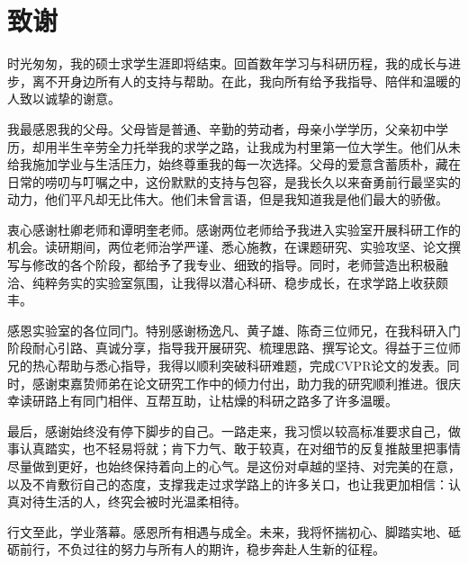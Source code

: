 \chapter{致谢}
时光匆匆，我的硕士求学生涯即将结束。回首数年学习与科研历程，我的成长与进步，离不开身边所有人的支持与帮助。在此，我向所有给予我指导、陪伴和温暖的人致以诚挚的谢意。

我最感恩我的父母。父母皆是普通、辛勤的劳动者，母亲小学学历，父亲初中学历，却用半生辛劳全力托举我的求学之路，让我成为村里第一位大学生。他们从未给我施加学业与生活压力，始终尊重我的每一次选择。父母的爱意含蓄质朴，藏在日常的唠叨与叮嘱之中，这份默默的支持与包容，是我长久以来奋勇前行最坚实的动力，他们平凡却无比伟大。他们未曾言语，但是我知道我是他们最大的骄傲。

衷心感谢杜卿老师和谭明奎老师。感谢两位老师给予我进入实验室开展科研工作的机会。读研期间，两位老师治学严谨、悉心施教，在课题研究、实验攻坚、论文撰写与修改的各个阶段，都给予了我专业、细致的指导。同时，老师营造出积极融洽、纯粹务实的实验室氛围，让我得以潜心科研、稳步成长，在求学路上收获颇丰。

感恩实验室的各位同门。特别感谢杨逸凡、黄子雄、陈奇三位师兄，在我科研入门阶段耐心引路、真诚分享，指导我开展研究、梳理思路、撰写论文。得益于三位师兄的热心帮助与悉心指导，我得以顺利突破科研难题，完成CVPR论文的发表。同时，感谢束嘉贽师弟在论文研究工作中的倾力付出，助力我的研究顺利推进。很庆幸读研路上有同门相伴、互帮互助，让枯燥的科研之路多了许多温暖。

最后，感谢始终没有停下脚步的自己。一路走来，我习惯以较高标准要求自己，做事认真踏实，也不轻易将就；肯下力气、敢于较真，在对细节的反复推敲里把事情尽量做到更好，也始终保持着向上的心气。是这份对卓越的坚持、对完美的在意，以及不肯敷衍自己的态度，支撑我走过求学路上的许多关口，也让我更加相信：认真对待生活的人，终究会被时光温柔相待。

行文至此，学业落幕。感恩所有相遇与成全。未来，我将怀揣初心、脚踏实地、砥砺前行，不负过往的努力与所有人的期许，稳步奔赴人生新的征程。